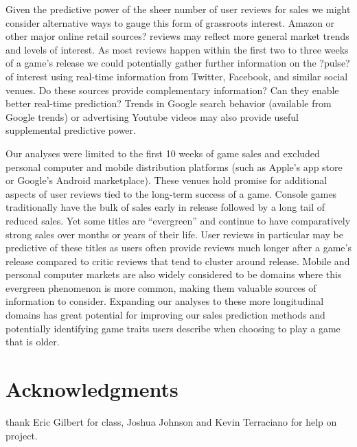 \documentclass[letterpaper]{article}
\begin{document}
Given the predictive power of the sheer number of user reviews for sales we might consider alternative ways to gauge this form of grassroots interest. Amazon or other major online retail sources? reviews may reflect more general market trends and levels of interest. As most reviews happen within the first two to three weeks of a game's release we could potentially gather further information on the ?pulse? of interest using real-time information from Twitter, Facebook, and similar social venues. Do these sources provide complementary information? Can they enable better real-time prediction? Trends in Google search behavior (available from Google trends) or advertising Youtube videos may also provide useful supplemental predictive power.

Our analyses were limited to the first 10 weeks of game sales and excluded personal computer and mobile distribution platforms (such as Apple's app store or Google's Android marketplace). These venues hold promise for additional aspects of user reviews tied to the long-term success of a game. Console games traditionally have the bulk of sales early in release followed by a long tail of reduced sales. Yet some titles are ``evergreen'' and continue to have comparatively strong sales over months or years of their life. User reviews in particular may be predictive of these titles as users often provide reviews much longer after a game's release compared to critic reviews that tend to cluster around release. Mobile and personal computer markets are also widely considered to be domains where this evergreen phenomenon is more common, making them valuable sources of information to consider. Expanding our analyses to these more longitudinal domains has great potential for improving our sales prediction methods and potentially identifying game traits users describe when choosing to play a game that is older.

\section{Acknowledgments}
thank Eric Gilbert for class, Joshua Johnson and Kevin Terraciano for help on project.



\end{document}
